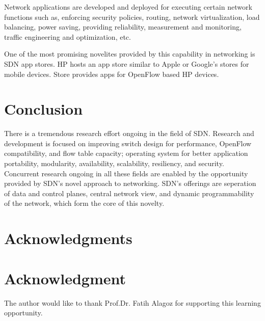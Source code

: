 \documentclass[12pt,journal,compsoc]{IEEEtran}
\begin{document}
Network applications are developed and deployed for executing 
certain network functions such as, 
enforcing security policies, routing, network virtualization, load balancing,
 power saving, providing reliability, measurement and monitoring,
 traffic engineering and optimization, etc.

One of the most promising novelites provided by this capability in 
networking is SDN app stores. HP hosts an app store similar to Apple or
 Google's stores for mobile devices. Store provides apps for OpenFlow
 based HP devices.
\section{Conclusion}
There is a tremendous research effort ongoing in the field of SDN. Research
 and development is focused on improving switch design for performance, 
OpenFlow compatibility, and flow table capacity; operating system for better
 application portability, modularity, availability, scalability, resiliency, 
and security. Concurrent research ongoing in all these fields are enabled by
 the opportunity provided by SDN's novel approach to networking. SDN's 
offerings are seperation of data and control planes, central network view, and 
dynamic programmability of the network, which form the core of this novelty.

\ifCLASSOPTIONcompsoc
  \section*{Acknowledgments}
\else
  \section*{Acknowledgment}
\fi


The author would like to thank Prof.Dr. Fatih Alagoz for supporting this learning opportunity.


\ifCLASSOPTIONcaptionsoff
  \newpage
\fi


\end{document}
